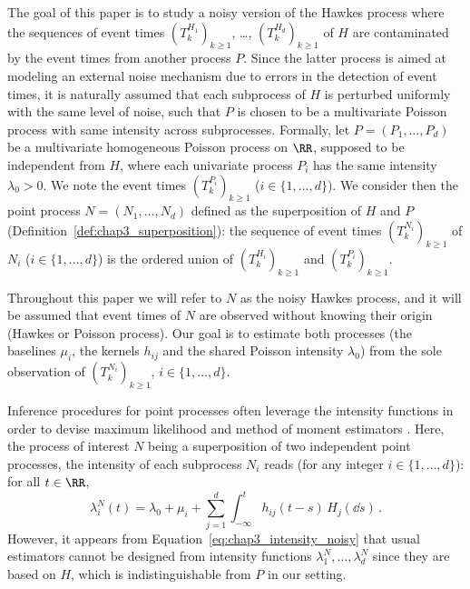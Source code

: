         The goal of this paper is to study a noisy version of the Hawkes process where the sequences of event times $(T_k^{H_1})_{k\ge1}$, \dots, $(T_k^{H_d})_{k\ge1}$ of $H$ are contaminated by the event times from another process $P$.
        Since the latter process is aimed at modeling an external noise mechanism due to errors in the detection of event times,
        it is naturally assumed that each subprocess of $H$ is perturbed uniformly with the same level of noise,
        such that $P$ is chosen to be a multivariate Poisson process with same intensity across subprocesses.
        Formally, let $P = (P_1, \ldots, P_d)$ be a multivariate homogeneous Poisson process on $\RR$, supposed to be independent from $H$, where each univariate process $P_i$ has the same intensity $\lambda_0 > 0$.
        We note the event times $(T_k^{P_i})_{k\ge1}$ ($i \in \{1, \dots, d\}$).        
        We consider then the point process $N = (N_1, \ldots, N_d)$ defined as the superposition of $H$ and $P$ (Definition~\ref{def:chap3_superposition}):
        the sequence of event times $(T_k^{N_i})_{k\ge1}$ of $N_i$ ($i \in \{1, \dots, d\}$) is the ordered union of $(T_k^{H_i})_{k\ge1}$ and $(T_k^{P_i})_{k\ge1}$.
        
        Throughout this paper we will refer to $N$ as the noisy Hawkes process,
        and it will be assumed that event times of $N$ are observed without knowing their origin (Hawkes or Poisson process).
        Our goal is to estimate both processes (\ie the baselines $\mu_i$, the kernels $h_{ij}$ and the shared Poisson intensity $\lambda_0$) from the sole observation of $(T_k^{N_i})_{k\geq1}$, $i \in \{1, \dots, d\}$.
        
        Inference procedures for point processes often leverage the intensity functions in order to devise maximum likelihood and method of moment estimators \parencite{Ogata1988, Ozaki1979, DaFonseca2013}.
        Here, the process of interest $N$ being a superposition of two independent point processes,
        the intensity of each subprocess $N_i$ reads (for any integer $i \in \{1, \dots, d\}$):
        for all $t \in \RR$,
        \begin{equation}
          \lambda_i^N(t) = \lambda_0 + \mu_i + \sum_{j=1}^{d}\int_{-\infty}^{t}{h_{ij}(t-s) \, H_j(\dd s)}\,.
          \label{eq:chap3_intensity_noisy}
        \end{equation}
        However, it appears from Equation~\eqref{eq:chap3_intensity_noisy} that usual estimators cannot be designed from intensity functions $\lambda_1^N, \dots, \lambda_d^N$ since they are based on $H$, 
        which is indistinguishable from $P$ in our setting.
        
